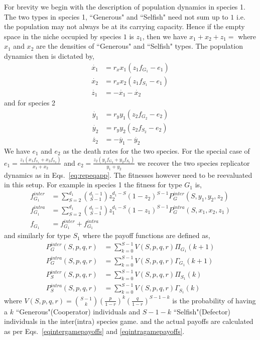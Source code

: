 \documentclass[12pt]{article}
\begin{document}
\begin{appendices}
For brevity we begin with the description of population dynamics in species 1.
The two types in species 1, ``Generous" and ``Selfish" need not sum up to $1$ i.e. the population may not always be at its carrying capacity.
Hence if the empty space in the niche occupied by species $1$ is $z_1$, then we have $x_1 + x_2 + z_1 = $ where $x_1$ and $x_2$ are the densities of ``Generous" and ``Selfish" types.
The population dynamics then is dictated by,
%
\begin{align}
	\dot{x_1} &= r_x x_1 (z_1 f_{G_1} - e_1)  \\
	\dot{x_2} &= r_x x_2 (z_1 f_{S_1} - e_1) \\
	\dot{z_1} &= - \dot{x_1} - \dot{x_2} 
\end{align}
%
and for species 2
\begin{align}
	\dot{y_1} &= r_y y_1 (z_2 f_{G_2} - e_2)  \\
	\dot{y_2} &= r_y y_2 (z_2 f_{S_2} - e_2) \\
	\dot{z_2} &= - \dot{y_1} - \dot{y_2} 
\end{align}
%
We have $e_1$ and $e_2$ as the death rates for the two species. 
For the special case of  $e_1 = \frac{z_1 (x_1 f_{x_1} + x_2 f_{x_2}) }{x_1 + x_2}$ and $e_2 = \frac{z_2 (y_1 f_{G_2} + y_2 f_{S_2}) }{y_1 + y_2}$ we recover the two species replicator dynamics as in Eqs.~\ref{eq:repeqapp}. 
The fitnesses however need to be reevaluated in this setup.
For example in species 1 the fitness for type $G_1$ is,
%
\begin{align}
	f_{G_1}^{inter} &= \sum_{S=2}^{d_1} \binom{d_1 -1}{S-1} z_2 ^{d_1 -S} (1-z_2)^{S-1} P_G^{inter}(S,y_1,y_2,z_2) \\
	f_{G_1}^{intra} &= \sum_{S=2}^{d_1} \binom{d_1 -1}{S-1} z_1 ^{d_1 -S} (1-z_1)^{S-1} P_G^{intra}(S,x_1,x_2,z_1) \\
	f_{G_1} &= f_{G_1}^{inter} + f_{G_1}^{intra}
\end{align}
%
and similarly for type $S_1$ where the payoff functions are defined as,
%
\begin{align}
	P_G^{inter}(S,p,q,r) &= \sum_{k=0}^{S-1} V(S,p,q,r) \Pi_{G_1}(k+1) \\
	P_G^{intra}(S,p,q,r) &= \sum_{k=0}^{S-1} V(S,p,q,r) \Gamma_{G_1}(k+1) \\
	P_S^{inter}(S,p,q,r) &= \sum_{k=0}^{S-1} V(S,p,q,r) \Pi_{S_1}(k) \\
	P_S^{intra}(S,p,q,r) &= \sum_{k=0}^{S-1} V(S,p,q,r) \Gamma_{S_1}(k)
\end{align}
%
where $V(S,p,q,r) = \binom{S-1}{k} \left( \frac{p}{1-r}\right)^k  \left(\frac{q}{1-r}\right)^{S-1-k}$ is the probability of having a $k$ ``Generous"(Cooperator) individuals and $S-1-k$ ``Selfish"(Defector) individuals in the inter(intra) species game.
and the actual payoffs are calculated as per Eqs.~\ref{eqintergamepayoffs} and \ref{eqintragamepayoffs}.

\end{appendices}
\end{document}
